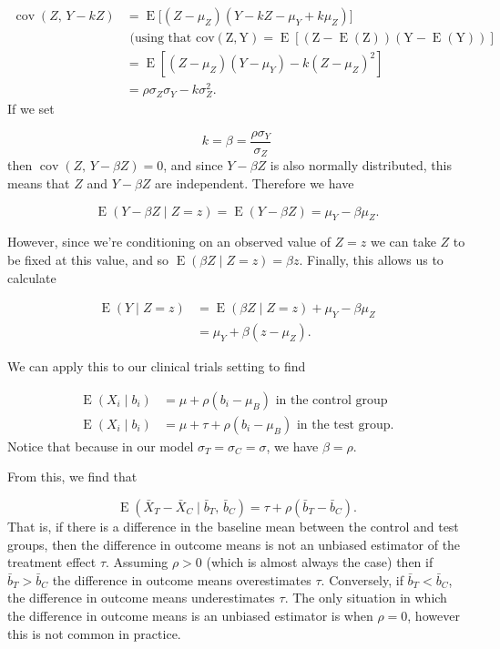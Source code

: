 \documentclass[
  openany]{book}
\theoremstyle{definition}
\theoremstyle{definition}
\theoremstyle{definition}
\theoremstyle{definition}
\theoremstyle{remark}
\begin{document}
\[
\begin{aligned}
\operatorname{cov}\left(Z,\,Y-kZ\right) &= \operatorname{E}\big[\left(Z-\mu_Z\right)\left(Y-kZ - \mu_Y + k\mu_Z\right)\big]\\
&\text{ (using that }\operatorname{cov\left(Z,Y\right)=\operatorname{E}\left[\left(Z-\operatorname{E}\left(Z\right)\right)\left(Y-\operatorname{E}\left(Y\right)\right)\right]}\\
& = \operatorname{E}\left[\left(Z-\mu_Z\right)\left(Y-\mu_Y\right) - k\left(Z-\mu_Z\right)^2\right]\\
& = \rho \sigma_Z\sigma_Y - k\sigma_Z^2.
\end{aligned}
\]
If we set

\[k = \beta = \frac{\rho\sigma_Y}{\sigma_Z} \]
then \(\operatorname{cov}\left(Z,\,Y-\beta Z\right)=0\), and since \(Y-\beta Z\) is also normally distributed, this means that \(Z\) and \(Y-\beta Z\) are independent. Therefore we have

\[\operatorname{E}\left(Y-\beta Z \mid Z=z\right) = \operatorname{E}\left(Y-\beta Z\right) = \mu_Y - \beta \mu_Z.\]

However, since we're conditioning on an observed value of \(Z=z\) we can take \(Z\) to be fixed at this value, and so \(\operatorname{E}\left(\beta Z\mid{Z=z}\right) = \beta z\). Finally, this allows us to calculate

\[
\begin{aligned}
\operatorname{E}\left(Y\mid{Z=z}\right) & = \operatorname{E}\left(\beta Z\mid{Z=z}\right) + \mu_Y - \beta\mu_Z\\
& = \mu_Y + \beta\left(z - \mu_Z\right).
\end{aligned}
\]

We can apply this to our clinical trials setting to find

\[
\begin{aligned}
\operatorname{E}\left(X_i\mid{b_i}\right) &= \mu + \rho\left(b_i - \mu_B\right)\text{ in the control group}\\
\operatorname{E}\left(X_i\mid{b_i}\right) &= \mu +\tau + \rho\left(b_i - \mu_B\right)\text{ in the test group.}
\end{aligned}
\]
Notice that because in our model \(\sigma_T = \sigma_C = \sigma\), we have \(\beta = \rho\).

From this, we find that

\begin{equation}
\operatorname{E}\left(\bar{X}_T - \bar{X}_C\mid{\bar{b}_T,\,\bar{b}_C}\right) = \tau + \rho\left(\bar{b}_T - \bar{b}_C\right). 
\label{eq:diffexp}
\end{equation}
That is, if there is a difference in the baseline mean between the control and test groups, then the difference in outcome means is not an unbiased estimator of the treatment effect \(\tau\). Assuming \(\rho>0\) (which is almost always the case) then if \(\bar{b}_T>\bar{b}_C\) the difference in outcome means overestimates \(\tau\). Conversely, if \(\bar{b}_T<\bar{b}_C\), the difference in outcome means underestimates \(\tau\). The only situation in which the difference in outcome means is an unbiased estimator is when \(\rho=0\), however this is not common in practice.
\end{document}
